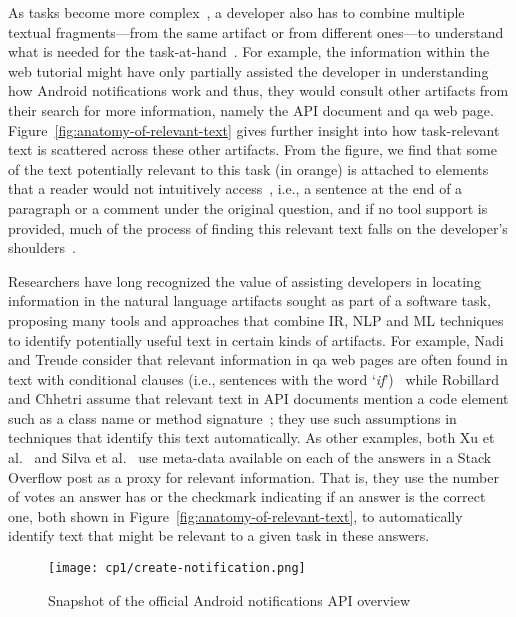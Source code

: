  
 
 
 As tasks become more complex~\cite{Pirolli2007, Bystrom1995}, a developer also has to combine multiple textual fragments---from the same artifact or from different ones---to understand what is needed for the task-at-hand~\cite{Piorkowski2016}. 
 For example, the information within the web tutorial 
 might have only partially assisted the developer in understanding how 
 Android notifications work and thus, they would consult other artifacts from their search for more information, namely the API document and \acs{qa} web page. 
 Figure~\ref{fig:anatomy-of-relevant-text} gives further insight into 
 how task-relevant text 
 is scattered across these other artifacts. 
 From the figure, we find that some of the text potentially relevant to this task (in orange) is attached to elements that a reader would not intuitively access~\cite{Robillard2015}, i.e., 
 a sentence at the end of a paragraph or a comment under the original question,
 and if no tool support is provided, much of the process of finding this relevant text falls on the developer's shoulders~\cite{gonccalves2011, Ko2006a, Bystrom1995}.
 
 
 
 Researchers have long recognized the value of 
  assisting developers in locating information in the natural language artifacts sought as part of a software task,
 proposing many tools and approaches 
 that combine \acf{IR}, \acf{NLP} and \acf{ML} techniques to identify potentially useful text in certain kinds of artifacts. 
 For example, Nadi and Treude consider 
 that relevant information in \acs{qa} 
 web pages are often found in text with
 conditional clauses (i.e., sentences with the word `\textit{if}')~\cite{nadi2020}
 while Robillard and Chhetri assume that relevant 
 text in API documents mention a code element such as a class name or method signature~\cite{Robillard2015}; they use such assumptions 
 in techniques that identify this text automatically.
 As other examples, both Xu et al.~\cite{Xu2017} 
 and Silva et al.~\cite{silva2019} use 
 meta-data available on each of the answers in a Stack Overflow post 
 as a proxy for relevant information.
 That is, they use the number of votes an answer has or the checkmark indicating if an answer is the correct one, both shown in Figure~\ref{fig:anatomy-of-relevant-text}, 
 to automatically identify text that might be relevant to a given task in these answers. 
 
 
 
 \begin{landscape}
 \begin{figure}
     \centering
     \texttt{[image: cp1/create-notification.png]}
     \caption{Snapshot of the official Android notifications API overview}
     \label{fig:android-create-notification}
 \end{figure}
 \end{landscape}
     
